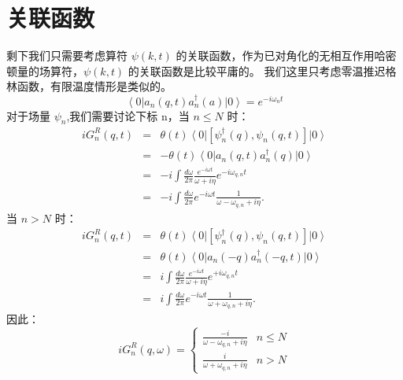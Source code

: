 \documentclass[UTF8]{ctexart}
\begin{document}
\section*{关联函数}
\noindent
剩下我们只需要考虑算符 $\psi\left(k,t\right)$ 的关联函数，作为已对角化的无相互作用哈密顿量的场算符，$\psi\left(k,t\right)$
的关联函数是比较平庸的。 我们这里只考虑零温推迟格林函数，有限温度情形是类似的。
\begin{equation}
\left\langle 0\right|a_{n}\left(q,t\right)a_{n}^{\dagger}\left(a\right)\left|0\right\rangle =e^{-i\omega_{n}t}
\end{equation}
对于场量 $\psi_{n}$,我们需要讨论下标 n，当 $n\le N$ 时：
\begin{eqnarray}
iG_{n}^{R}\left(q,t\right) & = & \theta\left(t\right)\left\langle 0\right|\left[\psi_{n}^{\dagger}\left(q\right),\psi_{n}\left(q,t\right)\right]\left|0\right\rangle \nonumber \\
 & = & -\theta\left(t\right)\left\langle 0\right|a_{n}\left(q,t\right)a_{n}^{\dagger}\left(q\right)\left|0\right\rangle \nonumber \\
 & = & -i\int\frac{d\omega}{2\pi}\frac{e^{-i\omega t}}{\omega+i\eta}e^{-i\omega_{q,n}t}\nonumber \\
 & = & -i\int\frac{d\omega}{2\pi}e^{-i\omega t}\frac{1}{\omega-\omega_{q,n}+i\eta}.
\end{eqnarray}
当 $n>N$ 时：
\begin{eqnarray}
iG_{n}^{R}\left(q,t\right) & = & \theta\left(t\right)\left\langle 0\right|\left[\psi_{n}^{\dagger}\left(q\right),\psi_{n}\left(q,t\right)\right]\left|0\right\rangle \nonumber \\
 & = & \theta\left(t\right)\left\langle 0\right|a_{n}\left(-q\right)a_{n}^{\dagger}\left(-q,t\right)\left|0\right\rangle \nonumber \\
 & = & i\int\frac{d\omega}{2\pi}\frac{e^{-i\omega t}}{\omega+i\eta}e^{+i\omega_{q,n}t}\nonumber \\
 & = & i\int\frac{d\omega}{2\pi}e^{-i\omega t}\frac{1}{\omega+\omega_{q,n}+i\eta}.
\end{eqnarray}
因此：
\begin{equation}
iG_{n}^{R}\left(q,\omega\right)=\begin{cases}
\frac{-i}{\omega-\omega_{q,n}+i\eta} & n\le N\\
\frac{i}{\omega+\omega_{q,n}+i\eta} & n>N
\end{cases}
\end{equation}
\end{document}
